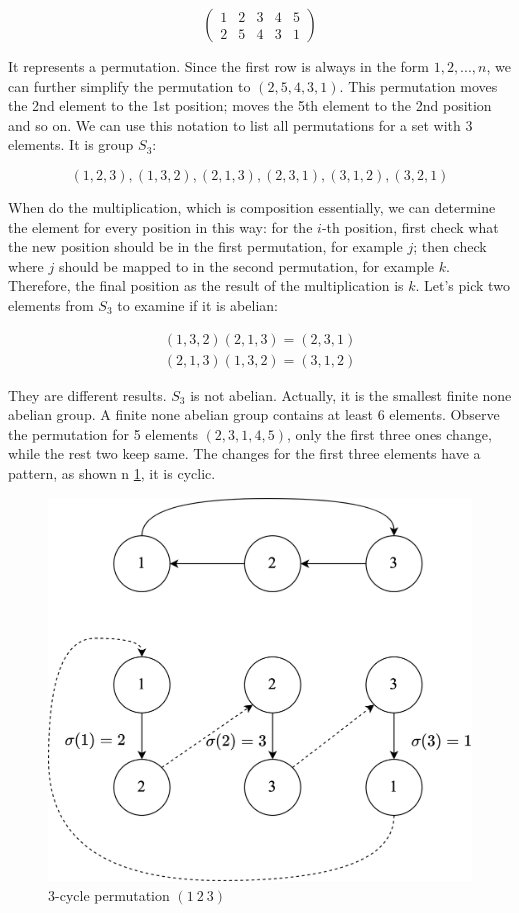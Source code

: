 \documentclass[b5paper]{article}
\begin{document}
\[
\begin{pmatrix}
1 & 2 & 3 & 4 & 5 \\
2 & 5 & 4 & 3 & 1
\end{pmatrix}
\]

It represents a permutation. Since the first row is always in the form $1, 2, ..., n$, we can further simplify the permutation to $(2, 5, 4, 3, 1)$. This permutation moves the 2nd element to the 1st position; moves the 5th element to the 2nd position and so on. We can use this notation to list all permutations for a set with 3 elements. It is group $S_3$:

\[
(1, 2, 3), (1, 3, 2), (2, 1, 3), (2, 3, 1), (3, 1, 2), (3, 2, 1)
\]

When do the multiplication, which is composition essentially, we can determine the element for every position in this way: for the $i$-th position, first check what the new position should be in the first permutation, for example $j$; then check where $j$ should be mapped to in the second permutation, for example $k$. Therefore, the final position as the result of the multiplication is $k$. Let's pick two elements from $S_3$ to examine if it is abelian:

\[
\begin{array}{l}
(1, 3, 2) (2, 1, 3) = (2, 3, 1) \\
(2, 1, 3) (1, 3, 2) = (3, 1, 2)
\end{array}
\]

They are different results. $S_3$ is not abelian. Actually, it is the smallest finite none abelian group. A finite none abelian group contains at least 6 elements. Observe the permutation for 5 elements $(2, 3, 1, 4, 5)$, only the first three ones change, while the rest two keep same. The changes for the first three elements have a pattern, as shown n \ref{fig:cycle-permutation}, it is cyclic.

\begin{figure}[htbp]
\centering
\includegraphics[scale=0.6]{img/3-cycle}
\caption{3-cycle permutation $(1\ 2\ 3)$}
\label{fig:cycle-permutation}
\end{figure}
\end{document}
